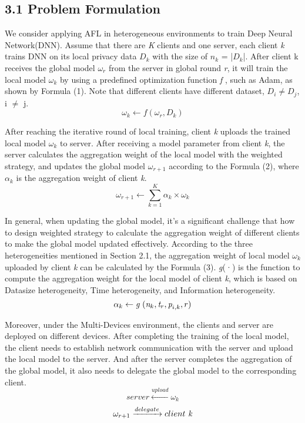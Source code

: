 \documentclass[twoside,twocolumn]{article}
\begin{document}
\subsection{3.1 Problem Formulation}
	We consider applying AFL in heterogeneous environments to train Deep Neural Network(DNN). Assume that there are \emph{K} clients and one server, each client \emph{k} trains DNN on its local privacy data $D_k$ with the size of $n_k$ = |$D_k$|. After client k receives the global model $\omega_r$ from the server in global round \emph{r}, it will train the local model $\omega_k$ by using a predefined optimization function \emph{f} , such as Adam, as shown by Formula (1). Note that different clients have different dataset, $D_i \neq D_j$, i $\neq$ j.
\begin{equation}
\omega_{k} \leftarrow f(\omega_r,D_k)
\end{equation} 

	After reaching the iterative round of local training, client \emph{k} uploads the trained local model $\omega_k$ to server. After receiving a model parameter from client \emph{k}, the server calculates the aggregation weight of the local model with the weighted strategy, and updates the global model $\omega_{r+1}$ according to the Formula (2), where $\alpha_k$ is the aggregation weight of client \emph{k}. 
\begin{equation}
\omega_{r+1} \leftarrow \sum_{k=1}^{K} \alpha_k \times \omega_k
\end{equation}

	In general, when updating the global model, it’s a significant challenge that how to design weighted strategy to calculate the aggregation weight of different clients to make the global model updated effectively. According to the three heterogeneities mentioned in Section 2.1, the aggregation weight of local model $\omega_k$ uploaded by client \emph{k} can be calculated by the Formula (3). \emph{g}(·) is the function to compute the aggregation weight for the local model of client \emph{k}, which is based on Datasize heterogeneity, Time heterogeneity, and Information heterogeneity.\\
\begin{equation}
\alpha_{k} \leftarrow \emph{g}\ ( \emph{n}_k,\emph{t}_r,\emph{p}_{i,k},r )
\end{equation}

	Moreover, under the Multi-Devices environment, the clients and server are deployed on different devices. After completing the training of the local model, the client needs to establish network communication with the server and upload the local model to the server. And after the server completes the aggregation of the global model, it also needs to delegate the global model to the corresponding client.
%
\begin{equation}
server\xleftarrow{upload}\omega_k
\end{equation}
\begin{equation}
\omega_{r+1}\xrightarrow{delegate} client\ \emph{k}
\end{equation}
\end{document}
